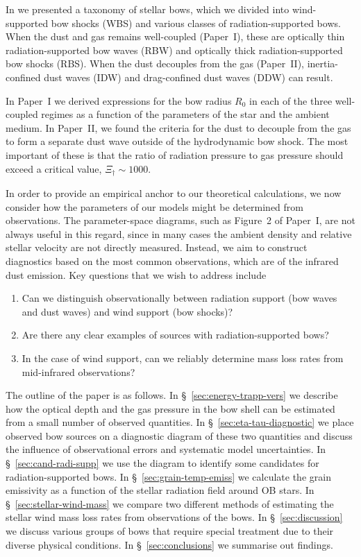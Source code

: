 \documentclass[useAMS, usenatbib, a4paper]{mnras}
\begin{document}
In \citet[Paper~I and Paper~II]{Henney:2019a, Henney:2019b} we
presented a taxonomy of stellar bows, which we divided into
wind-supported bow shocks (WBS) and various classes of
radiation-supported bows.  When the dust and gas remains well-coupled
(Paper~I), these are optically thin radiation-supported bow waves
(RBW) and optically thick radiation-supported bow shocks (RBS).  When
the dust decouples from the gas (Paper~II), inertia-confined dust
waves (IDW) and drag-confined dust waves (DDW) can result.

In Paper~I we derived expressions for the bow radius \(R_0\) in each of
the three well-coupled regimes as a function of the parameters of the
star and the ambient medium.  In Paper~II, we found the criteria for
the dust to decouple from the gas to form a separate dust wave outside
of the hydrodynamic bow shock.  The most important of these is that
the ratio of radiation pressure to gas pressure should exceed a
critical value, \(\Xi_\dag \sim 1000\).  

In order to provide an empirical anchor to our theoretical
calculations, we now consider how the parameters of our models might
be determined from observations.  The parameter-space diagrams, such
as Figure~2 of Paper~I, are not always useful in this regard, since in
many cases the ambient density and relative stellar velocity are not
directly measured.  Instead, we aim to construct diagnostics based on
the most common observations, which are of the infrared dust emission.
Key questions that we wish to address include
\begin{enumerate}[1.]
\item Can we distinguish observationally between radiation support
  (bow waves and dust waves) and wind support (bow shocks)?
\item Are there any clear examples of sources with radiation-supported bows?
\item In the case of wind support, can we reliably determine mass loss
  rates from mid-infrared observations?
\end{enumerate}

The outline of the paper is as follows. In
\S~\ref{sec:energy-trapp-vers} we describe how the optical depth and
the gas pressure in the bow shell can be estimated from a small number
of observed quantities.  In \S~\ref{sec:eta-tau-diagnostic} we place
observed bow sources on a diagnostic diagram of these two quantities
and discuss the influence of observational errors and systematic model
uncertainties. In \S~\ref{sec:cand-radi-supp} we use the diagram to
identify some candidates for radiation-supported bows. In
\S~\ref{sec:grain-temp-emiss} we calculate the grain emissivity as a
function of the stellar radiation field around OB stars.  In
\S~\ref{sec:stellar-wind-mass} we compare two different methods of
estimating the stellar wind mass loss rates from observations of the
bows. In \S~\ref{sec:discussion} we discuss various groups of bows
that require special treatment due to their diverse physical
conditions. In \S~\ref{sec:conclusions} we summarise out findings.
\end{document}
